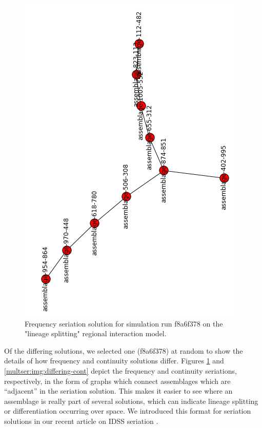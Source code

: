 \begin{figure}[ht]
\centering
\includegraphics[scale=0.4]{graphics/multipleseriation/f8a6f378-freq.png}
\caption{Frequency seriation solution for simulation run f8a6f378 on the "lineage splitting" regional interaction model.}
\label{multser:img:differing-freq}
\end{figure}

Of the differing solutions, we selected one (f8a6f378) at random to show
the details of how frequency and continuity solutions differ. Figures
\ref{multser:img:differing-freq} and \ref{multser:img:differing-cont} depict the
frequency and continuity seriations, respectively, in the form of graphs
which connect assemblages which are ``adjacent'' in the seriation
solution. This makes it easier to see where an assemblage is really part
of several solutions, which can indicate lineage splitting or
differentiation occurring over space. We introduced this format for
seriation solutions in our recent article on IDSS seriation
\citep{Lipo2015}.

